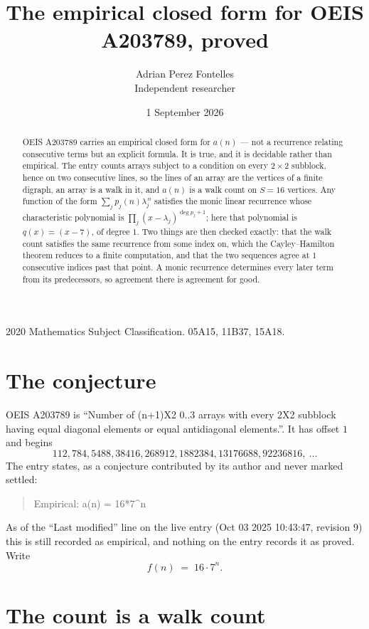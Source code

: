 \documentclass[11pt,a4paper]{article}
\title{The empirical closed form for OEIS A203789, proved}
\author{Adrian Perez Fontelles\\ \small Independent researcher}
\date{1 September 2026}
\theoremstyle{plain}
\theoremstyle{definition}
\begin{document}
\maketitle

\begin{abstract}
OEIS A203789 carries an empirical closed form for $a(n)$ --- not a recurrence relating
consecutive terms but an explicit formula. It is true, and it is decidable rather than
empirical. The entry counts arrays subject to a condition on every $2\times2$ subblock, hence on two consecutive lines, so the lines of an array are the
vertices of a finite digraph, an array is a walk in it, and $a(n)$ is a walk count on
$S=16$ vertices. Any function of the form $\sum_j p_j(n)\lambda_j^{\,n}$ satisfies the
monic linear recurrence whose characteristic polynomial is
$\prod_j(x-\lambda_j)^{\deg p_j+1}$; here that polynomial is $q(x)=(x-7)$, of degree
$1$. Two things are then checked exactly: that the walk count satisfies the same
recurrence from some index on, which the Cayley--Hamilton theorem reduces to a finite
computation, and that the two sequences agree at $1$ consecutive indices past that
point. A monic recurrence determines every later term from its predecessors, so agreement
there is agreement for good.
\end{abstract}

\noindent\small 2020 Mathematics Subject Classification. 05A15, 11B37, 15A18.\normalsize

\section{The conjecture}

OEIS A203789 is ``Number of (n+1)X2 0..3 arrays with every 2X2 subblock having equal diagonal elements or equal antidiagonal elements.''. It has offset $1$ and begins
\[
112, 784, 5488, 38416, 268912, 1882384, 13176688, 92236816,\ \dots
\]
The entry states, as a conjecture contributed by its author and never marked settled:
\begin{quote}
Empirical: a(n) = 16*7\^{}n
\end{quote}
As of the ``Last modified'' line on the live entry (Oct 03 2025 10:43:47, revision 9) this is still
recorded as empirical, and nothing on the entry records it as proved. Write
\[
f(n)\;=\;16 \cdot 7^{n}.
\]

\section{The count is a walk count}
\end{document}
